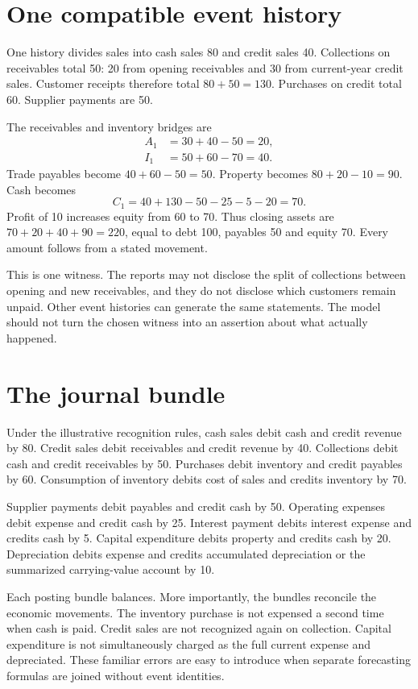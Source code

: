 \section{One compatible event history}
One history divides sales into cash sales 80 and credit sales 40. Collections on receivables total 50: 20 from opening receivables and 30 from current-year credit sales. Customer receipts therefore total $80+50=130$. Purchases on credit total 60. Supplier payments are 50.

The receivables and inventory bridges are
\begin{align}
 A_1&=30+40-50=20,\\
 I_1&=50+60-70=40.
\end{align}
Trade payables become $40+60-50=50$. Property becomes $80+20-10=90$. Cash becomes
\begin{equation}
 C_1=40+130-50-25-5-20=70.
 \label{sim:company-cash}
\end{equation}
Profit of 10 increases equity from 60 to 70. Thus closing assets are $70+20+40+90=220$, equal to debt 100, payables 50 and equity 70. Every amount follows from a stated movement.

This is one witness. The reports may not disclose the split of collections between opening and new receivables, and they do not disclose which customers remain unpaid. Other event histories can generate the same statements. The model should not turn the chosen witness into an assertion about what actually happened.

\section{The journal bundle}
Under the illustrative recognition rules, cash sales debit cash and credit revenue by 80. Credit sales debit receivables and credit revenue by 40. Collections debit cash and credit receivables by 50. Purchases debit inventory and credit payables by 60. Consumption of inventory debits cost of sales and credits inventory by 70.

Supplier payments debit payables and credit cash by 50. Operating expenses debit expense and credit cash by 25. Interest payment debits interest expense and credits cash by 5. Capital expenditure debits property and credits cash by 20. Depreciation debits expense and credits accumulated depreciation or the summarized carrying-value account by 10.

Each posting bundle balances. More importantly, the bundles reconcile the economic movements. The inventory purchase is not expensed a second time when cash is paid. Credit sales are not recognized again on collection. Capital expenditure is not simultaneously charged as the full current expense and depreciated. These familiar errors are easy to introduce when separate forecasting formulas are joined without event identities.

